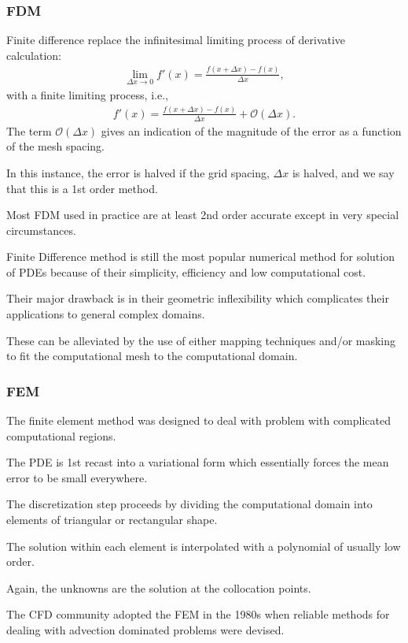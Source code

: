 \documentclass{article}
\begin{document}
\subsubsection{FDM}
Finite difference replace the infinitesimal limiting process of derivative calculation:
\begin{align*}
	\lim_{\Delta x\to 0} f'(x) = \frac{f(x + \Delta x) - f(x)}{\Delta x},
\end{align*}
with a finite limiting process, i.e.,
\begin{align*}
	f'(x) = \frac{f(x + \Delta x) - f(x)}{\Delta x} + \mathcal{O}(\Delta x).
\end{align*}
The term $\mathcal{O}(\Delta x)$ gives an indication of the magnitude of the error as a function of the mesh spacing.

In this instance, the error is halved if the grid spacing, $\Delta x$ is halved, and we say that this is a 1st order method.

Most FDM used in practice are at least 2nd order accurate except in very special circumstances.

Finite Difference method is still the most popular numerical method for solution of PDEs because of their simplicity, efficiency and low computational cost.

Their major drawback is in their geometric inflexibility which complicates their applications to general complex domains.

These can be alleviated by the use of either mapping techniques and/or masking to fit the computational mesh to the computational domain. 

\subsubsection{FEM}
The finite element method was designed to deal with problem with complicated computational regions.

The PDE is 1st recast into a variational form which essentially forces the mean error to be small everywhere.

The discretization step proceeds by dividing the computational domain into elements of triangular or rectangular shape.

The solution within each element is interpolated with a polynomial of usually low order.

Again, the unknowns are the solution at the collocation points.

The CFD community adopted the FEM in the 1980s when reliable methods for dealing with advection dominated problems were devised.
\end{document}
